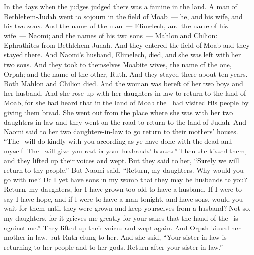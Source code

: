 
\begin{inparaenum}
   In the days when the judges judged there was a famine in the land. A man of Bethlehem-Judah went to sojourn in the field of Moab~--- he, and his wife, and his two sons.%
   And the name of the man~--- Elimelech; and the name of his wife~--- Naomi; and the names of his two sons~--- Mahlon and Chilion: Ephrathites from Bethlehem-Judah. And they entered the field of Moab and they stayed there.%
   And Naomi's husband, Elimelech, died, and she was left with her two sons.%
   And they took to themselves Moabite wives, the name of the one, Orpah; and the name of the other, Ruth. And they stayed there about ten years.%
   Both Mahlon and Chilion died. And the woman was bereft of her two boys and her husband.%
   And she rose up with her daughters-in-law to return to the land of Moab, for she had heard that in the land of Moab the \lord\ had visited His people by giving them bread.%
   She went out from the place where she was with her two daughters-in-law and they went on the road to return to the land of Judah.%
   And Naomi said to her two daughters-in-law to go return to their mothers' houses. ``The \lord\ will do kindly with you according as ye have done with the dead and myself.%
   The \lord\ will give you rest in your husbands' houses.'' Then she kissed them, and they lifted up their voices and wept.%
   But they said to her, ``Surely we will return to thy people.''%
   But Naomi said, ``Return, my daughters. Why would you go with me? Do I yet have sons in my womb that they may be husbands to you?%
   Return, my daughters, for I have grown too old to have a husband. If I were to say I have hope, and if I were to have a man tonight, and have sons,%
   would you wait for them until they were grown and keep yourselves from a husband? Not so, my daughters, for it grieves me greatly for your sakes that the hand of the \lord\ is against me.''%
   They lifted up their voices and wept again. And Orpah kissed her mother-in-law, but Ruth clung to her.%
   And she said, ``Your sister-in-law is returning to her people and to her gods. Return after your sister-in-law.''%

\end{inparaenum}
